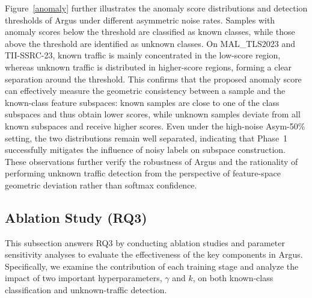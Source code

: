 \documentclass{SCIS2026}
\begin{document}
Figure~\ref{anomaly} further illustrates the anomaly score distributions and detection thresholds of Argus under different asymmetric noise rates. Samples with anomaly scores below the threshold are classified as known classes, while those above the threshold are identified as unknown classes. On MAL\_TLS2023 and TII-SSRC-23, known traffic is mainly concentrated in the low-score region, whereas unknown traffic is distributed in higher-score regions, forming a clear separation around the threshold. This confirms that the proposed anomaly score can effectively measure the geometric consistency between a sample and the known-class feature subspaces: known samples are close to one of the class subspaces and thus obtain lower scores, while unknown samples deviate from all known subspaces and receive higher scores. Even under the high-noise Asym-50\% setting, the two distributions remain well separated, indicating that Phase~1 successfully mitigates the influence of noisy labels on subspace construction. These observations further verify the robustness of Argus and the rationality of performing unknown traffic detection from the perspective of feature-space geometric deviation rather than softmax confidence.










\subsection{Ablation Study (RQ3)}
This subsection answers RQ3 by conducting ablation studies and parameter sensitivity analyses to evaluate the effectiveness of the key components in Argus. Specifically, we examine the contribution of each training stage and analyze the impact of two important hyperparameters, $\gamma$ and $k$, on both known-class classification and unknown-traffic detection.
\end{document}
